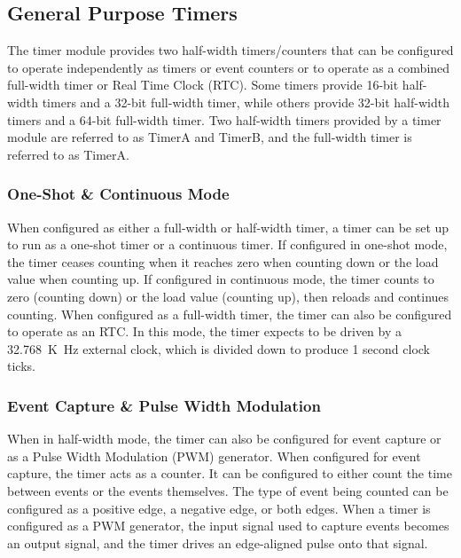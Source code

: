 \documentclass{article}
\begin{document}
\subsection{General Purpose Timers}
The timer module provides two half-width timers/counters that can be
configured to operate independently as timers or event counters or to
operate as a combined full-width timer or Real Time Clock (RTC). Some
timers provide 16-bit half-width timers and a 32-bit full-width timer,
while others provide 32-bit half-width timers and a 64-bit full-width
timer. Two half-width timers provided by a timer module are referred to
as TimerA and TimerB, and the full-width timer is referred to as
TimerA.
\subsubsection{One-Shot \& Continuous Mode}
When configured as either a full-width or half-width timer, a timer can
be set up to run as a one-shot timer or a continuous timer. If
configured in one-shot mode, the timer ceases counting when it reaches
zero when counting down or the load value when counting up. If
configured in continuous mode, the timer counts to zero (counting down)
or the load value (counting up), then reloads and continues counting.
When configured as a full-width timer, the timer can also be configured
to operate as an RTC. In this mode, the timer expects to be driven by a
\qty{32.768}{K.Hz} external clock, which is divided down to produce 1
second clock ticks.
\subsubsection{Event Capture \& Pulse Width Modulation}
When in half-width mode, the timer can also be configured for event
capture or as a Pulse Width Modulation (PWM) generator. When configured
for event capture, the timer acts as a counter. It can be configured to
either count the time between events or the events themselves. The type
of event being counted can be configured as a positive edge, a negative
edge, or both edges. When a timer is configured as a PWM generator, the
input signal used to capture events becomes an output signal, and the
timer drives an edge-aligned pulse onto that signal.
\end{document}
